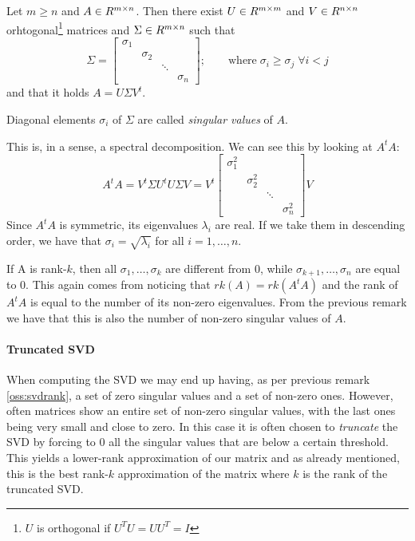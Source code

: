 \begin{Teo} \label{teo:svd}
  Let $m \geq n$ and $A \in R^{m \times n}$. Then there exist $U \in R^{m \times m}$ and $V \in R^{n \times n}$ orhtogonal\footnote{$U$ is orthogonal if $U^TU = UU^T = I$} matrices and $\Sigma \in R^{m \times n}$ such that
  \[
  \Sigma =
  \begin{bmatrix}
    \sigma_1 &&&\\
    & \sigma_2 &&\\
    && \ddots &\\
    &&& \sigma_n
  \end{bmatrix}
  ; \qquad \text{where} \; \sigma_i \geq \sigma_j \; \forall i < j
  \]
  and that it holds $A = U \Sigma V^t$.
\end{Teo}
Diagonal elements $\sigma_i$ of $\Sigma$ are called \emph{singular values} of $A$.
\begin{Oss}
  This is, in a sense, a spectral decomposition. We can see this by looking at $A^t A$:
  \[
  A^t A = V^t \Sigma U^t U \Sigma V = V^t
  \begin{bmatrix}
    \sigma_1^2 &&&\\
    & \sigma_2^2 &&\\
    && \ddots &\\
    &&& \sigma_n^2
  \end{bmatrix}
  V
  \]
  Since $A^t A$ is symmetric, its eigenvalues $\lambda_i$ are real. If we take them in descending order, we have that $\sigma_i = \sqrt{\lambda_i}$ for all $i = 1, \ldots, n$.
\end{Oss}
\begin{Oss} \label{oss:svdrank}
  If A is rank-$k$, then all $\sigma_1, \ldots, \sigma_k$ are different from $0$, while $\sigma_{k+1}, \ldots, \sigma_n$ are equal to $0$. This again comes from noticing that $rk(A) = rk(A^t A)$ and the rank of $A^t A$ is equal to the number of its non-zero eigenvalues. From the previous remark we have that this is also the number of non-zero singular values of $A$.
\end{Oss}

\paragraph{Truncated SVD}
When computing the SVD we may end up having, as per previous remark \eqref{oss:svdrank}, a set of zero singular values and a set of non-zero ones. However, often matrices show an entire set of non-zero singular values, with the last ones being very small and close to zero.
In this case it is often chosen to \emph{truncate} the SVD by forcing to $0$ all the singular values that are below a certain threshold. This yields a lower-rank approximation of our matrix and as already mentioned, this is the best rank-$k$ approximation of the matrix where $k$ is the rank of the truncated SVD.

